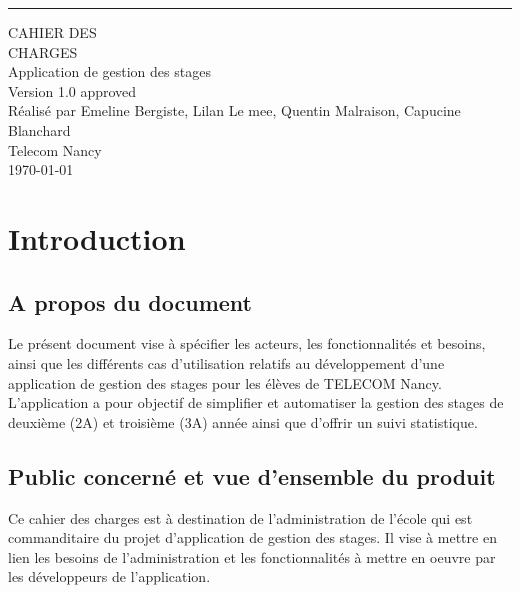 \documentclass{scrreprt}
\date{}
\def\myversion{1.0 }
\begin{document}
\begin{flushright}
    \rule{16cm}{5pt}\vskip1cm
	\centering
    \begin{bfseries}
        \Huge{CAHIER DES\\ CHARGES}\\
        \vspace{1.9cm}
        Application de gestion des stages\\
        \vspace{1.9cm}
        \LARGE{Version \myversion approved}\\
        \vspace{1.9cm}
        Réalisé par Emeline Bergiste, Lilan Le mee, Quentin Malraison, Capucine Blanchard\\
        \vspace{1.9cm}
        Telecom Nancy\\
        \vspace{2.9cm}
        \today\\
    \end{bfseries}

\end{flushright}

\tableofcontents

\chapter{Introduction}

\section{A propos du document}
Le présent document vise à spécifier les acteurs, les fonctionnalités et besoins, ainsi que les différents cas d’utilisation relatifs au développement d’une application de gestion des stages pour les élèves de TELECOM Nancy. L’application a pour objectif de simplifier et automatiser la gestion des stages de deuxième (2A) et troisième (3A) année ainsi que d’offrir un suivi statistique.

\section{Public concerné et vue d’ensemble du produit}
Ce cahier des charges est à destination de l’administration de l’école qui est commanditaire du projet d’application de gestion des stages. Il vise à mettre en lien les besoins de l’administration et les fonctionnalités à mettre en oeuvre par les développeurs de l’application. 
\end{document}
